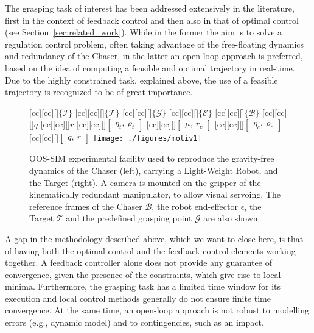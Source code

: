 The grasping task of interest has been addressed extensively in the literature, first in the context of feedback control and then also in that of optimal control (see Section~\ref{sec:related_work}). While in the former the aim is to solve a regulation control problem, often taking advantage of the free-floating dynamics and redundancy of the Chaser, in the latter an open-loop approach is preferred, based on the idea of computing a feasible and optimal trajectory in real-time. Due to the highly constrained task, explained above, the use of a feasible trajectory is recognized to be of great importance.
\begin{figure}[t!]
[cc][cc][\FontFigBBB]{{\color{white}$\{\mathcal{I}\}$}}
[cc][cc][\FontFigBBB]{{\color{black}$\{\mathcal{T}\}$}}
[cc][cc][\FontFigBBB]{{\color{black}$\{\mathcal{G}\}$}}
[cc][cc][\FontFigBBB]{{\color{black}$\{\mathcal{E}\}$}}
[cc][cc][\FontFigBBB]{{\color{black}$\{\mathcal{B}\}$}}
[cc][cc][\FontFigBB]{{\color{black}$q$}}
[cc][cc][\FontFigBB]{{\color{black}$r$}}
[cc][cc][\FontFigBB]{{\color{black}$\begin{bmatrix}\eta_t,~ \rho_t \end{bmatrix}$}}
[cc][cc][\FontFigBB]{{\color{black}$\begin{bmatrix}\mu,~ r_c \end{bmatrix}$}}
[cc][cc][\FontFigBB]{{\color{black}$\begin{bmatrix}\eta_c,~ \rho_c \end{bmatrix}$}}
[cc][cc][\FontFigBB]{{\color{black}$\begin{bmatrix}q,~ r \end{bmatrix}$}}
\centering\texttt{[image: ./figures/motiv1]}
\caption{OOS-SIM experimental facility used to reproduce the gravity-free dynamics of the Chaser (left), carrying a Light-Weight Robot, and the Target (right). A camera is mounted on the gripper of the kinematically redundant manipulator, to allow visual servoing. The reference frames of the Chaser $\mathcal{B}$, the robot end-effector $\mathcal{\epsilon}$, the Target $\mathcal{T}$ and the predefined grasping point $\mathcal{G}$ are also shown.}
\label{fig:facility}
\end{figure}

A gap in the methodology described above, which we want to close here, is that of having both the optimal control and the feedback control elements working together. A feedback controller alone does not provide any guarantee of convergence, given the presence of the constraints, which give rise to local minima. Furthermore, the grasping task has a limited time window for its execution and local control methods generally do not ensure finite time convergence. At the same time, an open-loop approach is not robust to modelling errors (e.g., dynamic model) and to contingencies, such as an impact. 

